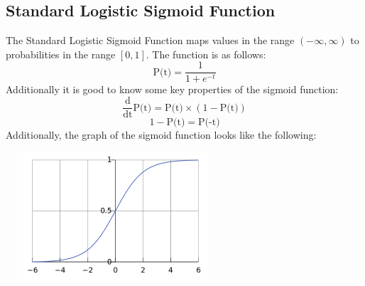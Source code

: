 \documentclass[a4paper]{article}
\begin{document}
\subsection{Standard Logistic Sigmoid Function}
The Standard Logistic Sigmoid Function maps values in the range $(-\infty, \infty)$  to probabilities in the range $[0, 1]$. The function is as follows:
\begin{equation}
    \text{P(t)} = \frac{1}{1 + e^{-t}}
\end{equation}
Additionally it is good to know some key properties of the sigmoid function:
\begin{equation}
    \frac{\text{d}}{\text{dt}}\text{P(t)} = \text{P(t)}\times (1-\text{P(t)})
\end{equation}
\begin{equation}
    1 - \text{P(t)} = \text{P(-t)}
\end{equation}
Additionally, the graph of the sigmoid function looks like the following:
\begin{center}
    \includegraphics[width=300px, height=180px]{sigmoid_function.png}
\end{center}
\end{document}
